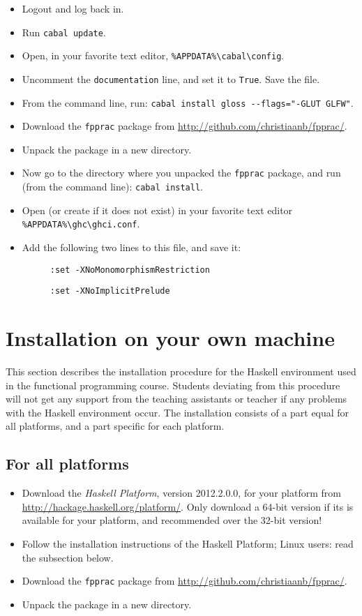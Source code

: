 \documentclass[]{article}
\begin{document}
\begin{itemize}
  \item Logout and log back in.
  \item Run \texttt{cabal update}.
  \item Open, in your favorite text editor, \texttt{\%APPDATA\%\textbackslash{}cabal\textbackslash{}config}.
  \item Uncomment the \texttt{documentation} line, and set it to \texttt{True}. Save the file.
  \item From the command line, run: \texttt{cabal install gloss -{}-flags="-GLUT GLFW"}.
  \item Download the \texttt{fpprac} package from \url{http://github.com/christiaanb/fpprac/}.
  \item Unpack the package in a new directory.
  \item Now go to the directory where you unpacked the \texttt{fpprac} package, and run (from the command line): \texttt{cabal install}.
  \item Open (or create if it does not exist) in your favorite text editor \texttt{\%APPDATA\%\textbackslash{}ghc\textbackslash{}ghci.conf}.
  \item Add the following two lines to this file, and save it:
  \begin{description}
    \item[] \texttt{:set -XNoMonomorphismRestriction}
    \item[] \texttt{:set -XNoImplicitPrelude}
  \end{description}
\end{itemize}

\section{Installation on your own machine}
This section describes the installation procedure for the Haskell environment used in the functional programming course.
Students deviating from this procedure will not get any support from the teaching assistants or teacher if any problems with the Haskell environment occur.
The installation consists of a part equal for all platforms, and a part specific for each platform.

\subsection{For all platforms}
\begin{itemize}
  \item Download the \emph{Haskell Platform}, version 2012.2.0.0, for your platform from \url{http://hackage.haskell.org/platform/}. Only download a 64-bit version if its is available for your platform, and recommended over the 32-bit version!
  \item Follow the installation instructions of the Haskell Platform; Linux users: read the subsection below.
  \item Download the \texttt{fpprac} package from \url{http://github.com/christiaanb/fpprac/}.
  \item Unpack the package in a new directory.
\end{itemize}
\end{document}
